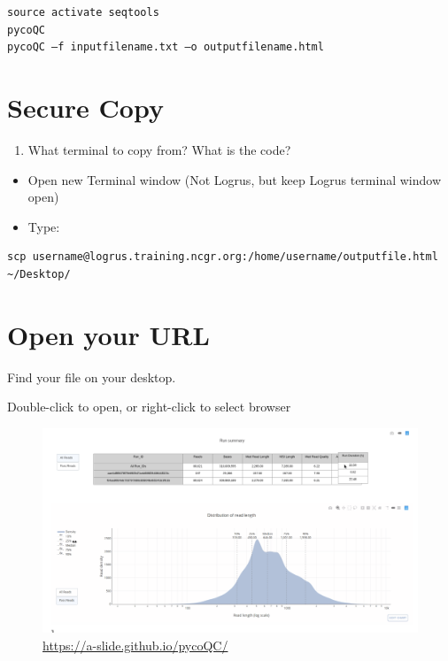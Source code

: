 \documentclass[
]{book}
\providecommand{\tightlist}{%
  \setlength{\itemsep}{0pt}\setlength{\parskip}{0pt}}
\begin{document}
\begin{verbatim}
source activate seqtools
pycoQC
pycoQC –f inputfilename.txt –o outputfilename.html
\end{verbatim}

\hypertarget{secure-copy}{%
\section{Secure Copy}\label{secure-copy}}

\begin{enumerate}
\def\labelenumi{\arabic{enumi}.}
\tightlist
\item
  What terminal to copy from? What is the code?
\end{enumerate}

\begin{itemize}
\tightlist
\item
  Open new Terminal window (Not Logrus, but keep Logrus terminal window open)\\
\item
  Type:
\end{itemize}

\begin{verbatim}
scp username@logrus.training.ncgr.org:/home/username/outputfile.html ~/Desktop/
\end{verbatim}

\hypertarget{open-your-url}{%
\section{Open your URL}\label{open-your-url}}

Find your file on your desktop.

Double-click to open, or right-click to select browser

\begin{figure}
\centering
\includegraphics[width=1\textwidth,height=\textheight]{Figures/PycoQC.png}
\caption{\url{https://a-slide.github.io/pycoQC/}}
\end{figure}
\end{document}
